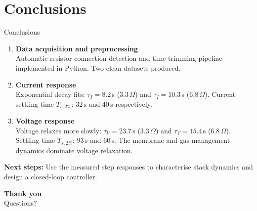 \documentclass[aspectratio=169]{beamer}
\begin{document}
\section{Conclusions}

\begin{frame}{Conclusions}
    \begin{enumerate}
        \item \textbf{Data acquisition and preprocessing}\\
              Automatic resistor-connection detection and time trimming pipeline
              implemented in Python.  Two clean datasets produced.

        \item \textbf{Current response}\\
              Exponential decay fits: $\tau_I = 8.2\,$s (3.3\,$\Omega$) and
              $\tau_I = 10.3\,$s (6.8\,$\Omega$). Current settling time $T_{s,2\%}$:
              32\,s and 40\,s respectively.

        \item \textbf{Voltage response}\\
              Voltage relaxes more slowly: $\tau_V = 23.7\,$s (3.3\,$\Omega$) and
              $\tau_V = 15.4\,$s (6.8\,$\Omega$). Settling time $T_{s,2\%}$:
              93\,s and 60\,s. The membrane and gas-management dynamics
              dominate voltage relaxation.
    \end{enumerate}
    \vspace{0.5em}
    \textbf{Next steps:} Use the measured step responses to characterise
    stack dynamics and design a closed-loop controller.
\end{frame}

\begin{frame}
    \begin{center}
        \Huge\textbf{Thank you}\\[1em]
        \Large Questions?
    \end{center}
\end{frame}
\end{document}
